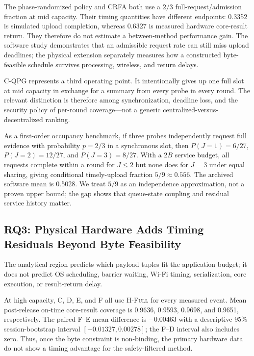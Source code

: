 \documentclass[10pt,journal]{IEEEtran}
\newcommand{\Hfull}{\textsc{H-Full}}
\newcommand{\CRFA}{\textsc{CRFA}}
\begin{document}
\begin{table}[t]
\centering
\caption{Mid-capacity software sensitivity on a common 270-event
denominator. ``Timely'' counts last-byte full-upload completion within 1~s;
core-result return is not simulated.}
\label{tab:rq2common}
\scriptsize

\end{table}

The phase-randomized policy and \CRFA{} both use a $2/3$
full-request/admission fraction at mid capacity. Their timing quantities have
different endpoints: 0.3352 is simulated upload completion, whereas 0.6327 is
measured hardware core-result return. They therefore do not estimate a
between-method performance gain. The software study demonstrates that an
admissible request rate can still miss upload deadlines; the physical
extension separately measures how a constructed byte-feasible schedule
survives processing, wireless, and return delays.

C-QPG represents a third operating point. It intentionally gives up one full
slot at mid capacity in exchange for a summary from every probe in every
round. The relevant distinction is therefore among synchronization, deadline
loss, and the security policy of per-round coverage---not a generic
centralized-versus-decentralized ranking.

As a first-order occupancy benchmark, if three probes independently request
full evidence with probability $p=2/3$ in a synchronous slot, then
$P(J=1)=6/27$, $P(J=2)=12/27$, and $P(J=3)=8/27$. With a 2$B$ service budget,
all requests complete within a round for $J\leq2$ but none does for $J=3$
under equal sharing, giving conditional timely-upload fraction $5/9\approx0.556$.
The archived software mean is 0.5028. We treat $5/9$ as an independence
approximation, not a proven upper bound; the gap shows that queue-state
coupling and residual service history matter.

\subsection{RQ3: Physical Hardware Adds Timing Residuals Beyond Byte Feasibility}
\label{subsec:physical-timing}
The analytical region predicts which payload tuples fit the application
budget; it does not predict OS scheduling, barrier waiting, Wi-Fi timing,
serialization, core execution, or result-return delay.

At high capacity, C, D, E, and F all use \Hfull{} for every measured event.
Mean post-release on-time core-result coverage is 0.9636, 0.9593, 0.9698, and
0.9651, respectively. The paired F--E mean difference is $-0.00463$ with a
descriptive 95\% session-bootstrap interval $[-0.01327,0.00278]$; the F--D
interval also includes zero. Thus, once the byte constraint is non-binding,
the primary hardware data do not show a timing advantage for the
safety-filtered method.
\end{document}
